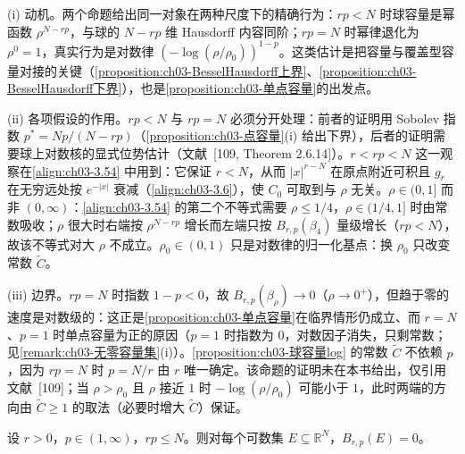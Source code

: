 \documentclass[../../main.tex]{subfiles}%
\begin{document}
\begin{remark}\label{remark:ch03-球容量动机}
(i) 动机。两个命题给出同一对象在两种尺度下的精确行为：$rp<N$ 时球容量是幂函数 $\rho^{N-rp}$，与球的 $N-rp$ 维 Hausdorff 内容同阶；$rp=N$ 时幂律退化为 $\rho^0=1$，真实行为是对数律 $(-\log(\rho/\rho_0))^{1-p}$。这类估计是把容量与覆盖型容量对接的关键（\cref{proposition:ch03-BesselHausdorff上界}、\cref{proposition:ch03-BesselHausdorff下界}），也是\cref{proposition:ch03-单点容量}的出发点。

(ii) 各项假设的作用。$rp<N$ 与 $rp=N$ 必须分开处理：前者的证明用 Sobolev 指数 $p^*=Np/(N-rp)$（\cref{proposition:ch03-点容量}(i) 给出下界），后者的证明需要球上对数核的显式位势估计（文献~[109, Theorem 2.6.14]）。$r<rp<N$ 这一观察在\eqref{align:ch03-3.54} 中用到：它保证 $r<N$，从而 $|x|^{r-N}$ 在原点附近可积且 $g_r$ 在无穷远处按 $e^{-|x|}$ 衰减（\eqref{align:ch03-3.6}），使 $C_0$ 可取到与 $\rho$ 无关。$\rho\in(0,1]$ 而非 $(0,\infty)$：\eqref{align:ch03-3.54} 的第二个不等式需要 $\rho\leqslant1/4$，$\rho\in(1/4,1]$ 时由常数吸收；$\rho$ 很大时右端按 $\rho^{N-rp}$ 增长而左端只按 $B_{r,p}(\beta_4)$ 量级增长（$rp<N$），故该不等式对大 $\rho$ 不成立。$\rho_0\in(0,1)$ 只是对数律的归一化基点：换 $\rho_0$ 只改变常数 $\widetilde C$。

(iii) 边界。$rp=N$ 时指数 $1-p<0$，故 $B_{r,p}(\beta_\rho)\to0$（$\rho\to0^+$），但趋于零的速度是对数级的：这正是\cref{proposition:ch03-单点容量}在临界情形仍成立、而 $r=N$、$p=1$ 时单点容量为正的原因（$p=1$ 时指数为 $0$，对数因子消失，只剩常数；见\cref{remark:ch03-无零容量集}(i)）。\cref{proposition:ch03-球容量log} 的常数 $\widetilde C$ 不依赖 $p$，因为 $rp=N$ 时 $p=N/r$ 由 $r$ 唯一确定。该命题的证明未在本书给出，仅引用文献~[109]；当 $\rho>\rho_0$ 且 $\rho$ 接近 $1$ 时 $-\log(\rho/\rho_0)$ 可能小于 $1$，此时两端的方向由 $\widetilde C\geqslant1$ 的取法（必要时增大 $\widetilde C$）保证。
\end{remark}

\begin{proposition}\label{proposition:ch03-单点容量}
设 $r>0$，$p\in(1,\infty)$，$rp\leqslant N$。则对每个可数集 $E\subseteq\mathbb{R}^N$，$B_{r,p}(E)=0$。
\end{proposition}
\end{document}
